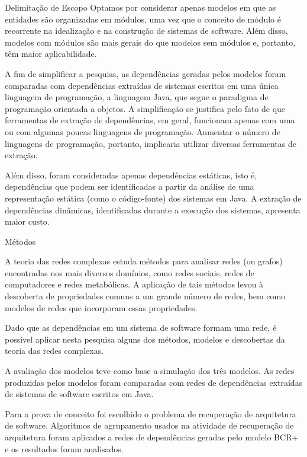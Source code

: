 \begin{section}{Delimitação de Escopo}
	Optamos por considerar apenas modelos em que as entidades são organizadas em módulos, uma vez que o conceito de módulo é recorrente na idealização e na construção de sistemas de software. Além disso, modelos com módulos são mais gerais do que modelos sem módulos e, portanto, têm maior aplicabilidade.
	
	A fim de simplificar a pesquisa, as dependências geradas pelos modelos foram comparadas com dependências extraídas de sistemas escritos em uma única linguagem de programação, a linguagem Java, que segue o paradigma de programação orientada a objetos. A simplificação se justifica pelo fato de que ferramentas de extração de dependências, em geral, funcionam apenas com uma ou com algumas poucas linguagens de programação. Aumentar o número de linguagens de programação, portanto, implicaria utilizar diversas ferramentas de extração.
	
	Além disso, foram consideradas apenas dependências estáticas, isto é, dependências que podem ser identificadas a partir da análise de uma representação estática (como o código-fonte) dos sistemas em Java. A extração de dependências dinâmicas, identificadas durante a execução dos sistemas, apresenta maior custo.

\end{section}

\begin{section}{Métodos}		
	
	A teoria das redes complexas estuda métodos para analisar redes (ou grafos) encontradas nos mais diversos domínios, como redes sociais, redes de computadores e redes metabólicas. A aplicação de tais métodos levou à descoberta de propriedades comuns a um grande número de redes, bem como modelos de redes que incorporam essas propriedades.
	
	Dado que as dependências em um sistema de software formam uma rede, é possível aplicar nesta pesquisa alguns dos métodos, modelos e descobertas da teoria das redes complexas. %
			
	A avaliação dos modelos teve como base a simulação dos três modelos. As redes produzidas pelos modelos foram comparadas com redes de dependências extraídas de sistemas de software escritos em Java. 
	
	Para a prova de conceito foi escolhido o problema de recuperação de arquitetura de software. Algoritmos de agrupamento usados na atividade de recuperação de arquitetura foram aplicados a redes de dependências geradas pelo modelo BCR+ e os resultados foram analisados. 

\end{section}

